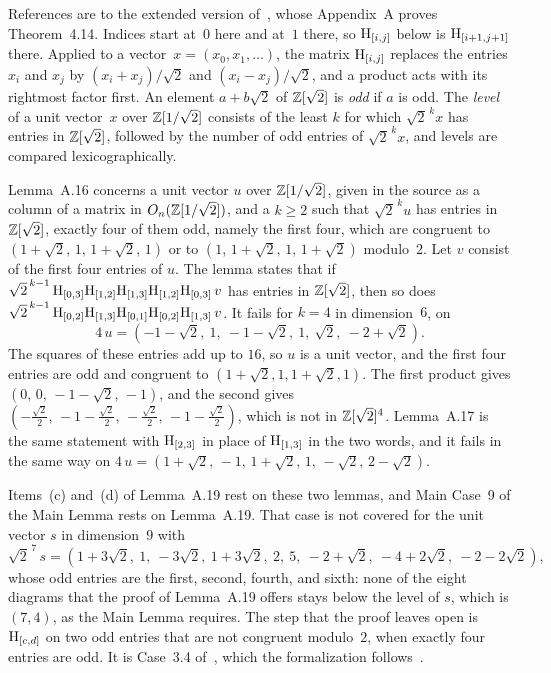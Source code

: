 \documentclass[acmsmall,screen,nonacm]{acmart}
\begin{document}
References are to the extended version of~\cite{fang2026hadamard}, whose Appendix~A proves Theorem~4.14. Indices start at~$0$ here and at~$1$ there, so $\mathrm{H}_{[i,j]}$ below is $\mathrm{H}_{[i+1,j+1]}$ there. Applied to a vector~$x=(x_0,x_1,\dots)$, the matrix $\mathrm{H}_{[i,j]}$ replaces the entries $x_i$ and $x_j$ by $(x_i+x_j)/\sqrt2$ and $(x_i-x_j)/\sqrt2$, and a product acts with its rightmost factor first. An element $a+b\sqrt2$ of $\mathbb{Z}[\sqrt2]$ is \emph{odd} if $a$ is odd. The \emph{level} of a unit vector~$x$ over $\mathbb{Z}[1/\sqrt2]$ consists of the least $k$ for which $\sqrt2^{\,k}x$ has entries in $\mathbb{Z}[\sqrt2]$, followed by the number of odd entries of $\sqrt2^{\,k}x$, and levels are compared lexicographically.

Lemma~A.16 concerns a unit vector $u$ over $\mathbb{Z}[1/\sqrt2]$, given in the source as a column of a matrix in $O_n(\mathbb{Z}[1/\sqrt2])$, and a $k\ge2$ such that $\sqrt2^{\,k}u$ has entries in $\mathbb{Z}[\sqrt2]$, exactly four of them odd, namely the first four, which are congruent to $(1+\sqrt2,\,1,\,1+\sqrt2,\,1)$ or to $(1,\,1+\sqrt2,\,1,\,1+\sqrt2)$ modulo~$2$. Let $v$ consist of the first four entries of $u$. The lemma states that if $\sqrt2^{\,k-1}\,\mathrm{H}_{[0,3]}\mathrm{H}_{[1,2]}\mathrm{H}_{[1,3]}\mathrm{H}_{[1,2]}\mathrm{H}_{[0,3]}\,v$ has entries in $\mathbb{Z}[\sqrt2]$, then so does $\sqrt2^{\,k-1}\,\mathrm{H}_{[0,2]}\mathrm{H}_{[1,3]}\mathrm{H}_{[0,1]}\mathrm{H}_{[0,2]}\mathrm{H}_{[1,3]}\,v$. It fails for $k=4$ in dimension~$6$, on
\[
4\,u=(-1-\sqrt2,\ 1,\ -1-\sqrt2,\ 1,\ \sqrt2,\ -2+\sqrt2).
\]
The squares of these entries add up to $16$, so $u$ is a unit vector, and the first four entries are odd and congruent to $(1+\sqrt2,1,1+\sqrt2,1)$. The first product gives $(0,\,0,\,-1-\sqrt2,\,-1)$, and the second gives $(-\tfrac{\sqrt2}{2},\,-1-\tfrac{\sqrt2}{2},\,-\tfrac{\sqrt2}{2},\,-1-\tfrac{\sqrt2}{2})$, which is not in $\mathbb{Z}[\sqrt2]^4$. Lemma~A.17 is the same statement with $\mathrm{H}_{[2,3]}$ in place of $\mathrm{H}_{[1,3]}$ in the two words, and it fails in the same way on $4\,u=(1+\sqrt2,\,-1,\,1+\sqrt2,\,1,\,-\sqrt2,\,2-\sqrt2)$.

Items~(c) and~(d) of Lemma~A.19 rest on these two lemmas, and Main Case~9 of the Main Lemma rests on Lemma~A.19. That case is not covered for the unit vector $s$ in dimension~$9$ with
\[
\sqrt2^{\,7}\,s=(1+3\sqrt2,\ 1,\ -3\sqrt2,\ 1+3\sqrt2,\ 2,\ 5,\ -2+\sqrt2,\ -4+2\sqrt2,\ -2-2\sqrt2),
\]
whose odd entries are the first, second, fourth, and sixth: none of the eight diagrams that the proof of Lemma~A.19 offers stays below the level of $s$, which is $(7,4)$, as the Main Lemma requires. The step that the proof leaves open is $\mathrm{H}_{[c,d]}$ on two odd entries that are not congruent modulo~$2$, when exactly four entries are odd. It is Case~3.4 of~\cite{clement2019thesis}, which the formalization follows~\cite{equacert2026artifact}.
\end{document}
